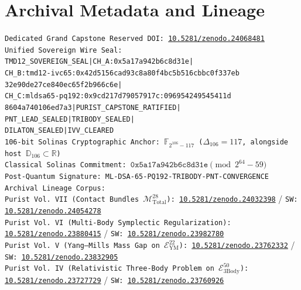 \documentclass[11pt,a4paper,reqno]{article}
\theoremstyle{plain}
\theoremstyle{definition}
\theoremstyle{remark}
\numberwithin{equation}{section}
\numberwithin{table}{section}
\newcommand{\Ddd}{\mathbb{D}_{106}}
\begin{document}
\section*{Archival Metadata and Lineage}
\begin{flushleft}
\small
\texttt{Dedicated Grand Capstone Reserved DOI: \href{https://doi.org/10.5281/zenodo.24068481}{10.5281/zenodo.24068481}}\\[0.4ex]
\texttt{Unified Sovereign Wire Seal: TMD12\_SOVEREIGN\_SEAL|CH\_A:0x5a17a942b6c8d31e|}\\
\texttt{CH\_B:tmd12-ivc65:0x42d5156cad93c8a80f4bc5b516cbbc0f337eb}\\
\texttt{32e90de27ce840ec65f2b966c6e|}\\
\texttt{CH\_C:mldsa65-pq192:0x9cd217d79057917c:096954249545411d}\\
\texttt{8604a740106ed7a3|PURIST\_CAPSTONE\_RATIFIED|}\\
\texttt{PNT\_LEAD\_SEALED|TRIBODY\_SEALED|}\\
\texttt{DILATON\_SEALED|IVV\_CLEARED}\\
\texttt{106-bit Solinas Cryptographic Anchor: $\mathbb{F}_{2^{106}-117}$ ($\Delta_{106} = 117$, alongside host $\Ddd \subset \mathbb{R}$)}\\
\texttt{Classical Solinas Commitment: $\mathtt{0x5a17a942b6c8d31e} \pmod{2^{64}-59}$}\\
\texttt{Post-Quantum Signature: ML-DSA-65-PQ192-TRIBODY-PNT-CONVERGENCE}\\[0.6ex]
\texttt{Archival Lineage Corpus:}\\
\texttt{Purist Vol.~VII (Contact Bundles $\mathcal{M}_{\mathrm{Total}}^{28}$): \href{https://doi.org/10.5281/zenodo.24032398}{10.5281/zenodo.24032398}} / \texttt{SW: \href{https://doi.org/10.5281/zenodo.24054278}{10.5281/zenodo.24054278}}\\
\texttt{Purist Vol.~VI (Multi-Body Symplectic Regularization): \href{https://doi.org/10.5281/zenodo.23880415}{10.5281/zenodo.23880415}} / \texttt{SW: \href{https://doi.org/10.5281/zenodo.23982780}{10.5281/zenodo.23982780}}\\
\texttt{Purist Vol.~V (Yang--Mills Mass Gap on $\mathcal{E}_{\mathrm{YM}}^{22}$): \href{https://doi.org/10.5281/zenodo.23762332}{10.5281/zenodo.23762332}} / \texttt{SW: \href{https://doi.org/10.5281/zenodo.23832905}{10.5281/zenodo.23832905}}\\
\texttt{Purist Vol.~IV (Relativistic Three-Body Problem on $\mathcal{E}_{\mathrm{3Body}}^{50}$): \href{https://doi.org/10.5281/zenodo.23727729}{10.5281/zenodo.23727729}} / \texttt{SW: \href{https://doi.org/10.5281/zenodo.23760926}{10.5281/zenodo.23760926}}\\

\end{flushleft}
\end{document}

